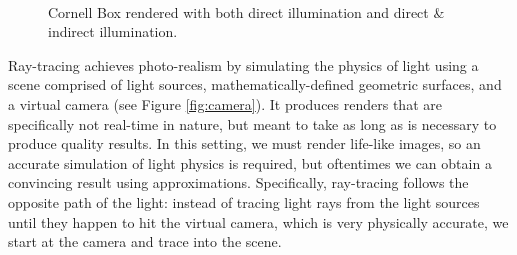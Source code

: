 \begin{figure}[h!]
    \centering
    ~
    \caption[Cornell Box direct \& indirect illumination]{Cornell Box rendered with both direct illumination and direct \& indirect illumination.}
    \label{fig:compare_illumination}
\end{figure}

Ray-tracing achieves photo-realism by simulating the physics of light using a scene comprised of light sources, mathematically-defined geometric surfaces, and a virtual camera (see Figure \ref{fig:camera}). It produces renders that are specifically not real-time in nature, but meant to take as long as is necessary to produce quality results. In this setting, we must render life-like images, so an accurate simulation of light physics is required, but oftentimes we can obtain a convincing result using approximations. Specifically, ray-tracing follows the opposite path of the light: instead of tracing light rays from the light sources until they happen to hit the virtual camera, which is very physically accurate, we start at the camera and trace into the scene.

